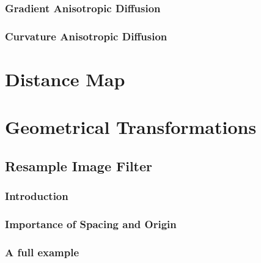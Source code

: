 \subsubsection{Gradient Anisotropic Diffusion}
\label{sec:ColorGradientAnisotropicDiffusion}



\subsubsection{Curvature Anisotropic Diffusion}
\label{sec:ColorCurvatureAnisotropicDiffusion}





\section{Distance Map}
\label{sec:DistanceMap}





\section{Geometrical Transformations}
\label{sec:GeometricalTransformationFilters}

\subsection{Resample Image Filter}
\label{sec:ResampleImageFilter}

\subsubsection{Introduction}


\subsubsection{Importance of Spacing and Origin}


\subsubsection{A full example}





